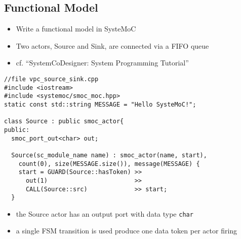 \subsection{Functional Model}

\begin{frame}[t]
\begin{figure}
\centering
\resizebox{0.7\columnwidth}{!}{}
\end{figure}

\begin{itemize}
\item Write a functional model in SysteMoC
\item Two actors, Source and Sink, are connected via a FIFO queue
\item cf. ``SystemCoDesigner: System Programming Tutorial''
\end{itemize}

\end{frame}


\begin{frame}[fragile=singleslide]
\begin{lstlisting}
//file vpc_source_sink.cpp
#include <iostream>
#include <systemoc/smoc_moc.hpp>
static const std::string MESSAGE = "Hello SysteMoC!";

class Source : public smoc_actor{
public:
  smoc_port_out<char> out;

  Source(sc_module_name name) : smoc_actor(name, start),
    count(0), size(MESSAGE.size()), message(MESSAGE) {
    start = GUARD(Source::hasToken) >>
      out(1)                        >>
      CALL(Source::src)             >> start;
  }
\end{lstlisting}
\begin{itemize}
\item the Source actor has an output port with data type \lstinline!char!
\item a single FSM transition is used produce one data token per actor firing
\end{itemize}
\end{frame}


